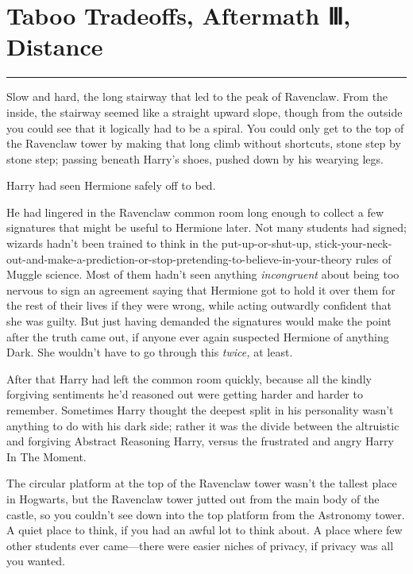 \chapter{Taboo Tradeoffs, Aftermath Ⅲ, Distance}

\begin{center}\rule{3in}{0.4pt}\end{center}

Slow and hard, the long stairway that led to the peak of Ravenclaw. From
the inside, the stairway seemed like a straight upward slope, though
from the outside you could see that it logically had to be a spiral. You
could only get to the top of the Ravenclaw tower by making that long
climb without shortcuts, stone step by stone step; passing beneath
Harry's shoes, pushed down by his wearying legs.

Harry had seen Hermione safely off to bed.

He had lingered in the Ravenclaw common room long enough to collect a
few signatures that might be useful to Hermione later. Not many students
had signed; wizards hadn't been trained to think in the
put-up-or-shut-up,
stick-your-neck-out-and-make-a-prediction-or-stop-pretending-to-believe-in-your-theory
rules of Muggle science. Most of them hadn't seen anything
\emph{incongruent} about being too nervous to sign an agreement saying
that Hermione got to hold it over them for the rest of their lives if
they were wrong, while acting outwardly confident that she was guilty.
But just having demanded the signatures would make the point after the
truth came out, if anyone ever again suspected Hermione of anything
Dark. She wouldn't have to go through this \emph{twice,} at least.

After that Harry had left the common room quickly, because all the
kindly forgiving sentiments he'd reasoned out were getting harder and
harder to remember. Sometimes Harry thought the deepest split in his
personality wasn't anything to do with his dark side; rather it was the
divide between the altruistic and forgiving Abstract Reasoning Harry,
versus the frustrated and angry Harry In The Moment.

The circular platform at the top of the Ravenclaw tower wasn't the
tallest place in Hogwarts, but the Ravenclaw tower jutted out from the
main body of the castle, so you couldn't see down into the top platform
from the Astronomy tower. A quiet place to think, if you had an awful
lot to think about. A place where few other students ever came---there
were easier niches of privacy, if privacy was all you wanted.

